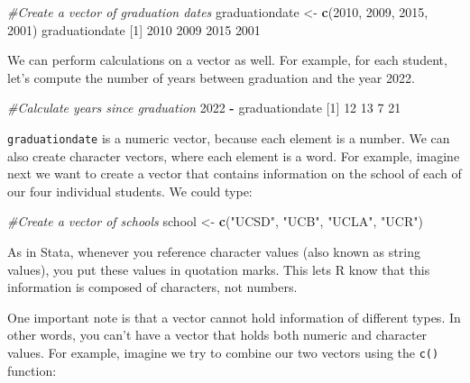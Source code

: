 \documentclass[
]{book}
\newenvironment{Shaded}{\begin{snugshade}}{\end{snugshade}}
\newcommand{\CommentTok}[1]{\textcolor[rgb]{0.56,0.35,0.01}{\textit{#1}}}
\newcommand{\DecValTok}[1]{\textcolor[rgb]{0.00,0.00,0.81}{#1}}
\newcommand{\FunctionTok}[1]{\textcolor[rgb]{0.13,0.29,0.53}{\textbf{#1}}}
\newcommand{\NormalTok}[1]{#1}
\newcommand{\OtherTok}[1]{\textcolor[rgb]{0.56,0.35,0.01}{#1}}
\newcommand{\SpecialCharTok}[1]{\textcolor[rgb]{0.81,0.36,0.00}{\textbf{#1}}}
\newcommand{\StringTok}[1]{\textcolor[rgb]{0.31,0.60,0.02}{#1}}
\begin{document}
\begin{Shaded}
\begin{Highlighting}[]
\CommentTok{\#Create a vector of graduation dates}
\NormalTok{graduationdate }\OtherTok{\textless{}{-}} \FunctionTok{c}\NormalTok{(}\DecValTok{2010}\NormalTok{, }\DecValTok{2009}\NormalTok{, }\DecValTok{2015}\NormalTok{, }\DecValTok{2001}\NormalTok{)}
\NormalTok{graduationdate}
\NormalTok{[}\DecValTok{1}\NormalTok{] }\DecValTok{2010} \DecValTok{2009} \DecValTok{2015} \DecValTok{2001}
\end{Highlighting}
\end{Shaded}

We can perform calculations on a vector as well. For example, for each student, let's compute the number of years between graduation and the year 2022.

\begin{Shaded}
\begin{Highlighting}[]
\CommentTok{\#Calculate years since graduation}
\DecValTok{2022} \SpecialCharTok{{-}}\NormalTok{ graduationdate}
\NormalTok{[}\DecValTok{1}\NormalTok{] }\DecValTok{12} \DecValTok{13}  \DecValTok{7} \DecValTok{21}
\end{Highlighting}
\end{Shaded}

\texttt{graduationdate} is a numeric vector, because each element is a number. We can also create character vectors, where each element is a word. For example, imagine next we want to create a vector that contains information on the school of each of our four individual students. We could type:

\begin{Shaded}
\begin{Highlighting}[]
\CommentTok{\#Create a vector of schools}
\NormalTok{school }\OtherTok{\textless{}{-}} \FunctionTok{c}\NormalTok{(}\StringTok{"UCSD"}\NormalTok{, }\StringTok{"UCB"}\NormalTok{, }\StringTok{"UCLA"}\NormalTok{, }\StringTok{"UCR"}\NormalTok{)}
\end{Highlighting}
\end{Shaded}

As in Stata, whenever you reference character values (also known as string values), you put these values in quotation marks. This lets R know that this information is composed of characters, not numbers.

One important note is that a vector cannot hold information of different types. In other words, you can't have a vector that holds both numeric and character values. For example, imagine we try to combine our two vectors using the \texttt{c()} function:
\end{document}
